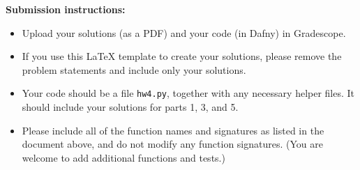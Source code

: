\documentclass{article}
\begin{document}
\noindent
\textbf{Submission instructions:}
\begin{itemize}
\item Upload your solutions (as a PDF) and your code (in Dafny) in Gradescope.
\item If you use this LaTeX template to create your solutions, please remove the problem statements
and include only your solutions.
\item Your code should be a file \texttt{hw4.py}, together with any necessary helper files.
It should include your solutions for parts 1, 3, and 5.
\item Please include all of the function names and signatures as listed in the document above,
and do not modify any function signatures. (You are welcome to add additional functions and tests.)
\end{itemize}
\end{document}
